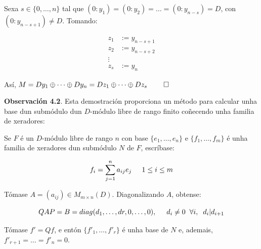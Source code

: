 \documentclass[twoside]{report}
\theoremstyle{mystyle}
\begin{document}
\noindent Sexa $s \in \{0, \dots, n\}$ tal que $(0 : y_{1}) = (0 : y_{2}) = \dots = (0 : y_{n-s}) = D$, con $(0 : y_{n-s+1}) \neq D$. Tomando:

\begin{align*}
    z_{1} & := y_{n-s+1}\\
    z_{2} & := y_{n-s+2} \\
    \vdots & \\
    z_{s} & := y_{n}
\end{align*}

\vspace{3mm}

\noindent Así, $M = Dy_{1} \oplus \cdots \oplus Dy_{n} = Dz_{1} \oplus \cdots \oplus Dz_{s} \hspace{8mm} \square$

\vspace{3mm}

\noindent \textbf{Observación 4.2}. Esta demostración proporciona un método para calcular unha base dun submódulo dun $D$-módulo libre de rango finito coñecendo unha familia de xeradores:\\

\begin{mdframed}[linecolor = classicrose, linewidth = 1mm]

\noindent Se $F$ é un $D$-módulo libre de rango $n$ con base $\{e_{1}, \dots, e_{n}\}$ e $\{f_{1}, \dots, f_{m}\}$ é unha familia de xeradores dun submódulo $N$ de $F$, escríbase:

$$f_{i} = \displaystyle \sum_{j = 1}^{n}a_{ij}e_{j} \hspace{5mm} 1 \leq i \leq m$$

\vspace{3mm}

\noindent Tómase $A = (a_{ij}) \in M_{m \times n}(D)$. Diagonalizando $A$, obtense:

$$QAP = B = diag(d_{1}, \dots, d{r}, 0, \dots, 0), \hspace{5mm} d_{i} \neq 0 \hspace{2mm} \forall i, \hspace{2mm} d_{i} | d_{i+1}$$

\vspace{2mm}

\noindent Tómase $f' = Qf$, e entón $\{f'_{1}, \dots, f'_{r}\}$ é unha base de $N$ e, ademais, $f'_{r+1} = \dots = f'_{n} = 0$.\\

\end{mdframed}
\end{document}
